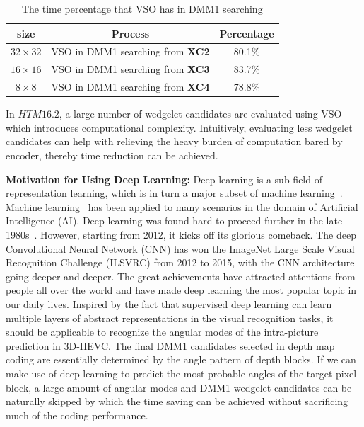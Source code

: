 \begin{table}[t]
    \caption{The time percentage that VSO has in DMM1 searching}
    \bigskip\label{tab:vso-in-dmm1-searching-time-percent-summary}
    \centering
    \begin{tabular}{c c c}
        \toprule
        size & Process & Percentage\\
        \midrule
        \(32\times32\)  & VSO in DMM1 searching from \textbf{XC2} & 80.1\% \\
        \(16\times16\) & VSO in DMM1 searching from \textbf{XC3} & 83.7\% \\
        \(8\times8\) & VSO in DMM1 searching from \textbf{XC4} & 78.8\% \\
        \bottomrule
    \end{tabular}
\end{table}
In \(HTM16.2\), a large number of wedgelet candidates are 
evaluated using VSO which
introduces computational complexity.
Intuitively, evaluating less wedgelet candidates can help with relieving
the heavy burden of computation bared by encoder,
thereby time reduction can be achieved.

\textbf{Motivation for Using Deep Learning:} Deep learning 
is a sub field of representation learning, which
is in turn a major subset of machine learning~\parencite{RN158}.
Machine learning~\parencite{RN198}
has been applied to many scenarios in the domain of Artificial Intelligence (AI).
Deep learning was found hard to proceed further
in the late 1980s~\parencite{RN199}.
However, starting from 2012, it kicks off its
glorious comeback.
The deep Convolutional Neural Network (CNN) has won the ImageNet
Large Scale Visual Recognition Challenge (ILSVRC)
from 2012 to 2015, with the CNN architecture going deeper
and deeper.
The great achievements have attracted attentions from 
people all over the world and
have made deep learning the most popular topic in our daily lives.
Inspired by the fact that supervised deep learning can learn multiple layers of
abstract representations in the visual recognition tasks, it should
be applicable to recognize the angular modes of the intra-picture
prediction in 3D-HEVC\@.
The final DMM1 candidates selected in depth map coding
are essentially determined by the angle pattern of depth blocks.
If we can make use of deep learning to predict the most probable angles of the
target pixel block, a large amount of angular modes and DMM1
wedgelet candidates can be naturally skipped by which the time saving can be
achieved without sacrificing much of the coding performance.


